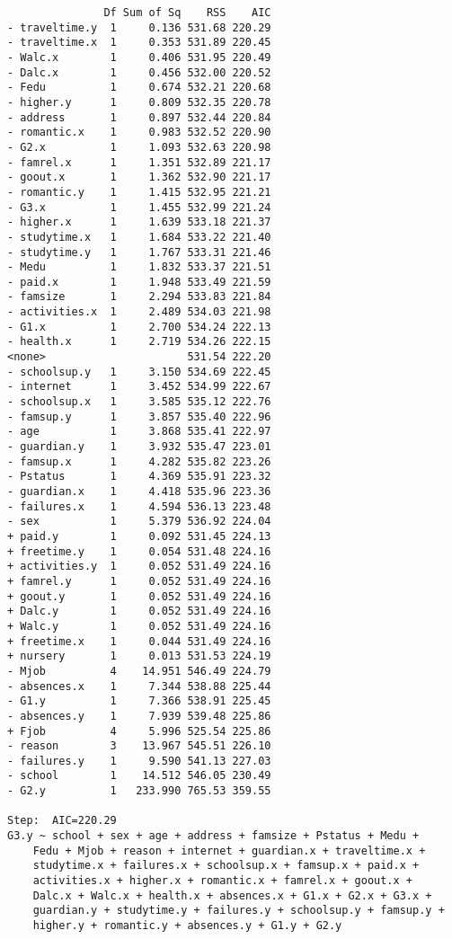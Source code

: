\documentclass[11pt]{article}
\begin{document}
\begin{enumerate}
\begin{verbatim}
               Df Sum of Sq    RSS    AIC
- traveltime.y  1     0.136 531.68 220.29
- traveltime.x  1     0.353 531.89 220.45
- Walc.x        1     0.406 531.95 220.49
- Dalc.x        1     0.456 532.00 220.52
- Fedu          1     0.674 532.21 220.68
- higher.y      1     0.809 532.35 220.78
- address       1     0.897 532.44 220.84
- romantic.x    1     0.983 532.52 220.90
- G2.x          1     1.093 532.63 220.98
- famrel.x      1     1.351 532.89 221.17
- goout.x       1     1.362 532.90 221.17
- romantic.y    1     1.415 532.95 221.21
- G3.x          1     1.455 532.99 221.24
- higher.x      1     1.639 533.18 221.37
- studytime.x   1     1.684 533.22 221.40
- studytime.y   1     1.767 533.31 221.46
- Medu          1     1.832 533.37 221.51
- paid.x        1     1.948 533.49 221.59
- famsize       1     2.294 533.83 221.84
- activities.x  1     2.489 534.03 221.98
- G1.x          1     2.700 534.24 222.13
- health.x      1     2.719 534.26 222.15
<none>                      531.54 222.20
- schoolsup.y   1     3.150 534.69 222.45
- internet      1     3.452 534.99 222.67
- schoolsup.x   1     3.585 535.12 222.76
- famsup.y      1     3.857 535.40 222.96
- age           1     3.868 535.41 222.97
- guardian.y    1     3.932 535.47 223.01
- famsup.x      1     4.282 535.82 223.26
- Pstatus       1     4.369 535.91 223.32
- guardian.x    1     4.418 535.96 223.36
- failures.x    1     4.594 536.13 223.48
- sex           1     5.379 536.92 224.04
+ paid.y        1     0.092 531.45 224.13
+ freetime.y    1     0.054 531.48 224.16
+ activities.y  1     0.052 531.49 224.16
+ famrel.y      1     0.052 531.49 224.16
+ goout.y       1     0.052 531.49 224.16
+ Dalc.y        1     0.052 531.49 224.16
+ Walc.y        1     0.052 531.49 224.16
+ freetime.x    1     0.044 531.49 224.16
+ nursery       1     0.013 531.53 224.19
- Mjob          4    14.951 546.49 224.79
- absences.x    1     7.344 538.88 225.44
- G1.y          1     7.366 538.91 225.45
- absences.y    1     7.939 539.48 225.86
+ Fjob          4     5.996 525.54 225.86
- reason        3    13.967 545.51 226.10
- failures.y    1     9.590 541.13 227.03
- school        1    14.512 546.05 230.49
- G2.y          1   233.990 765.53 359.55

Step:  AIC=220.29
G3.y ~ school + sex + age + address + famsize + Pstatus + Medu + 
    Fedu + Mjob + reason + internet + guardian.x + traveltime.x + 
    studytime.x + failures.x + schoolsup.x + famsup.x + paid.x + 
    activities.x + higher.x + romantic.x + famrel.x + goout.x + 
    Dalc.x + Walc.x + health.x + absences.x + G1.x + G2.x + G3.x + 
    guardian.y + studytime.y + failures.y + schoolsup.y + famsup.y + 
    higher.y + romantic.y + absences.y + G1.y + G2.y


\end{verbatim}
\end{enumerate}
\end{document}
